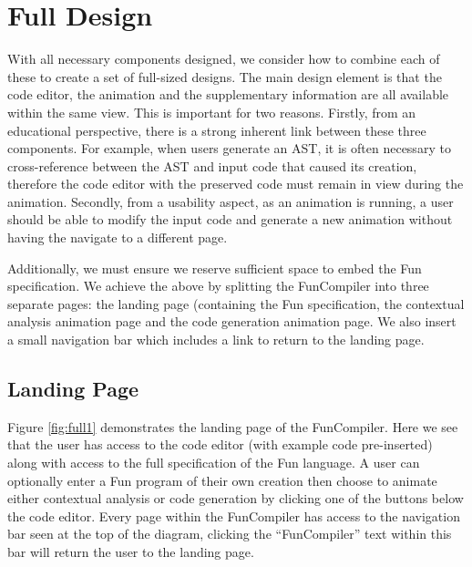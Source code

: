 \documentclass{l4proj}
\begin{document}
\pagebreak
\section{Full Design}
With all necessary components designed, we consider how to combine each of these to create a set of full-sized designs. The main design element is that the code editor, the animation and the supplementary information are all available within the same view. This is important for two reasons. Firstly, from an educational perspective, there is a strong inherent link between these three components. For example, when users generate an AST, it is often necessary to cross-reference between the AST and input code that caused its creation, therefore the code editor with the preserved code must remain in view during the animation. Secondly, from a usability aspect, as an animation is running, a user should be able to modify the input code and generate a new animation without having the navigate to a different page.

Additionally, we must ensure we reserve sufficient space to embed the Fun specification. We achieve the above by splitting the FunCompiler into three separate pages: the landing page (containing the Fun specification, the contextual analysis animation page and the code generation animation page. We also insert a small navigation bar which includes a link to return to the landing page.

\subsection{Landing Page}
Figure \ref{fig:full1} demonstrates the landing page of the FunCompiler. Here we see that the user has access to the code editor (with example code pre-inserted) along with access to the full specification of the Fun language. A user can optionally enter a Fun program of their own creation then choose to animate either contextual analysis or code generation by clicking one of the buttons below the code editor. Every page within the FunCompiler has access to the navigation bar seen at the top of the diagram, clicking the ``FunCompiler'' text within this bar will return the user to the landing page.
\end{document}

